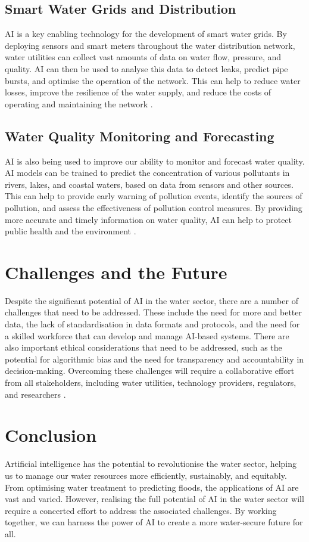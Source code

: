 \subsection{Smart Water Grids and Distribution}

AI is a key enabling technology for the development of smart water grids. By deploying sensors and smart meters throughout the water distribution network, water utilities can collect vast amounts of data on water flow, pressure, and quality. AI can then be used to analyse this data to detect leaks, predict pipe bursts, and optimise the operation of the network. This can help to reduce water losses, improve the resilience of the water supply, and reduce the costs of operating and maintaining the network \parencite{hussain2024artificial}.

\subsection{Water Quality Monitoring and Forecasting}

AI is also being used to improve our ability to monitor and forecast water quality. AI models can be trained to predict the concentration of various pollutants in rivers, lakes, and coastal waters, based on data from sensors and other sources. This can help to provide early warning of pollution events, identify the sources of pollution, and assess the effectiveness of pollution control measures. By providing more accurate and timely information on water quality, AI can help to protect public health and the environment \parencite{goyal2020review}.

\section{Challenges and the Future}

Despite the significant potential of AI in the water sector, there are a number of challenges that need to be addressed. These include the need for more and better data, the lack of standardisation in data formats and protocols, and the need for a skilled workforce that can develop and manage AI-based systems. There are also important ethical considerations that need to be addressed, such as the potential for algorithmic bias and the need for transparency and accountability in decision-making. Overcoming these challenges will require a collaborative effort from all stakeholders, including water utilities, technology providers, regulators, and researchers \parencite{hussain2024artificial}.

\section{Conclusion}

Artificial intelligence has the potential to revolutionise the water sector, helping us to manage our water resources more efficiently, sustainably, and equitably. From optimising water treatment to predicting floods, the applications of AI are vast and varied. However, realising the full potential of AI in the water sector will require a concerted effort to address the associated challenges. By working together, we can harness the power of AI to create a more water-secure future for all.